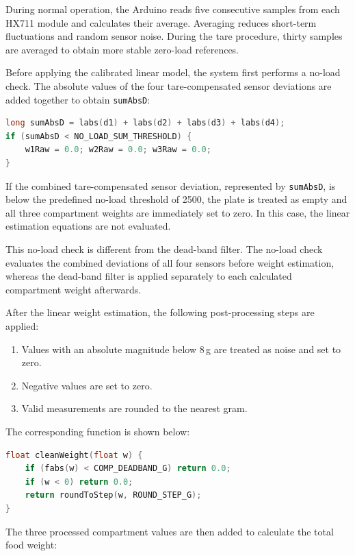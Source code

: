 \documentclass[11pt,a4paper]{article}
\begin{document}
During normal operation, the Arduino reads five consecutive samples from each HX711 module and calculates their average. Averaging reduces short-term fluctuations and random sensor noise. During the tare procedure, thirty samples are averaged to obtain more stable zero-load references.

Before applying the calibrated linear model, the system first performs a no-load check. The absolute values of the four tare-compensated sensor deviations are added together to obtain \texttt{sumAbsD}:

\begin{lstlisting}[language=C]
long sumAbsD = labs(d1) + labs(d2) + labs(d3) + labs(d4);
if (sumAbsD < NO_LOAD_SUM_THRESHOLD) {
    w1Raw = 0.0; w2Raw = 0.0; w3Raw = 0.0;
}
\end{lstlisting}

If the combined tare-compensated sensor deviation, represented by \texttt{sumAbsD}, is below the predefined no-load threshold of 2500, the plate is treated as empty and all three compartment weights are immediately set to zero. In this case, the linear estimation equations are not evaluated.

This no-load check is different from the dead-band filter. The no-load check evaluates the combined deviations of all four sensors before weight estimation, whereas the dead-band filter is applied separately to each calculated compartment weight afterwards.

After the linear weight estimation, the following post-processing steps are applied:

\begin{enumerate}
  \item Values with an absolute magnitude below 8\,g are treated as noise and set to zero.
  \item Negative values are set to zero.
  \item Valid measurements are rounded to the nearest gram.
\end{enumerate}

The corresponding function is shown below:

\begin{lstlisting}[language=C]
float cleanWeight(float w) {
    if (fabs(w) < COMP_DEADBAND_G) return 0.0;
    if (w < 0) return 0.0;
    return roundToStep(w, ROUND_STEP_G);
}
\end{lstlisting}

The three processed compartment values are then added to calculate the total food weight:
\end{document}
